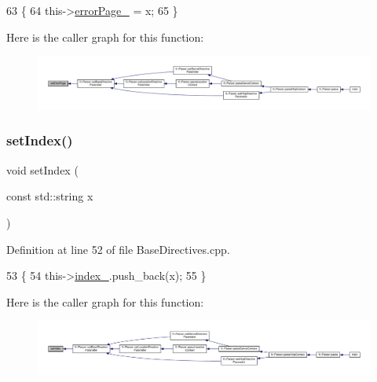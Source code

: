 \begin{DoxyCode}
63     \{
64         this->\hyperlink{classft_1_1_base_directives_a5c0d388109f086503961de84fe3fce90}{errorPage\_} = x;
65     \}
\end{DoxyCode}
Here is the caller graph for this function\+:
\nopagebreak
\begin{figure}[H]
\begin{center}
\leavevmode
\includegraphics[width=350pt]{classft_1_1_base_directives_a505ecc88b3e1779583ad60cc243c7769_icgraph}
\end{center}
\end{figure}
\mbox{\label{classft_1_1_base_directives_a6d3d8fd6eaaf71304128af6b3cee2a69}} 
\subsubsection{\texorpdfstring{set\+Index()}{setIndex()}}
{\footnotesize\ttfamily void set\+Index (\begin{DoxyParamCaption}\item[{const std\+::string}]{x }\end{DoxyParamCaption})}



Definition at line 52 of file Base\+Directives.\+cpp.


\begin{DoxyCode}
53     \{
54         this->\hyperlink{classft_1_1_base_directives_a6ba30626837f300201cd32c35d50aa49}{index\_}.push\_back(x);
55     \}
\end{DoxyCode}
Here is the caller graph for this function\+:
\nopagebreak
\begin{figure}[H]
\begin{center}
\leavevmode
\includegraphics[width=350pt]{classft_1_1_base_directives_a6d3d8fd6eaaf71304128af6b3cee2a69_icgraph}
\end{center}
\end{figure}
\mbox{\label{classft_1_1_base_directives_a0818b8529872ba9622329e2118d20c39}} 

